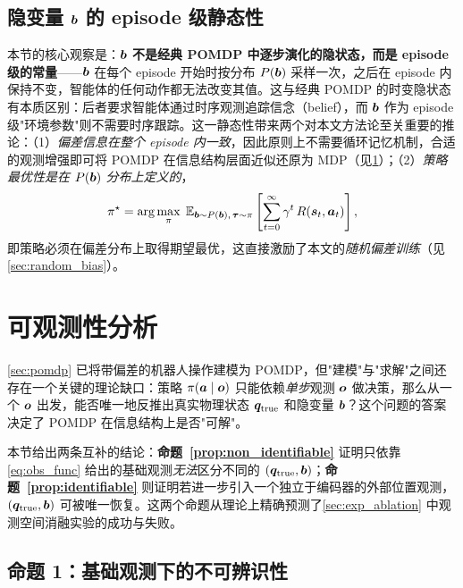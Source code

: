 \subsection{隐变量 \texorpdfstring{$\bm{b}$}{b} 的 episode 级静态性}\label{subsec:bias_static}

本节的核心观察是：\textbf{$\bm{b}$ 不是经典 POMDP 中逐步演化的隐状态，而是 episode 级的常量}——$\bm{b}$ 在每个 episode 开始时按分布 $P(\bm{b})$ 采样一次，之后在 episode 内保持不变，智能体的任何动作都无法改变其值。这与经典 POMDP 的时变隐状态有本质区别：后者要求智能体通过时序观测追踪信念（belief），而 $\bm{b}$ 作为 episode 级"环境参数"则不需要时序跟踪。这一静态性带来两个对本文方法论至关重要的推论：（1）\emph{偏差信息在整个 episode 内一致}，因此原则上不需要循环记忆机制，合适的观测增强即可将 POMDP 在信息结构层面近似还原为 MDP（见\cref{sec:observability}）；（2）\emph{策略最优性是在 $P(\bm{b})$ 分布上定义的}，
\begin{equation}
  \pi^\star = \arg\max_{\pi}\; \mathbb{E}_{\bm{b} \sim P(\bm{b}),\,\bm{\tau} \sim \pi} \left[\sum_{t=0}^{\infty} \gamma^t\, R(\bm{s}_t, \bm{a}_t)\right],
  \label{eq:objective}
\end{equation}
即策略必须在偏差分布上取得期望最优，这直接激励了本文的\emph{随机偏差训练}（见\cref{sec:random_bias}）。

\section{可观测性分析}\label{sec:observability}

\cref{sec:pomdp} 已将带偏差的机器人操作建模为 POMDP，但"建模"与"求解"之间还存在一个关键的理论缺口：策略 $\pi(\bm{a} \mid \bm{o})$ 只能依赖\emph{单步}观测 $\bm{o}$ 做决策，那么从一个 $\bm{o}$ 出发，能否唯一地反推出真实物理状态 $\bm{q}_{\text{true}}$ 和隐变量 $\bm{b}$？这个问题的答案决定了 POMDP 在信息结构上是否"可解"。

本节给出两条互补的结论：\textbf{命题~\ref{prop:non_identifiable}} 证明只依靠\cref{eq:obs_func} 给出的基础观测\emph{无法}区分不同的 $(\bm{q}_{\text{true}}, \bm{b})$；\textbf{命题~\ref{prop:identifiable}} 则证明若进一步引入一个独立于编码器的外部位置观测，$(\bm{q}_{\text{true}}, \bm{b})$ 可被唯一恢复。这两个命题从理论上精确预测了\cref{sec:exp_ablation} 中观测空间消融实验的成功与失败。

\subsection{命题 1：基础观测下的不可辨识性}\label{subsec:unidentifiable}

